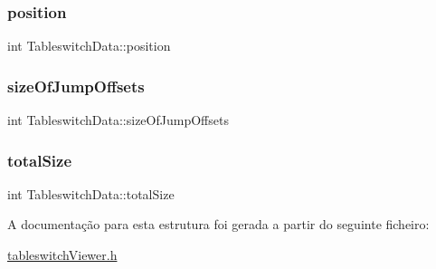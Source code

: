 \subsubsection{\texorpdfstring{position}{position}}
{\footnotesize\ttfamily int Tableswitch\+Data\+::position}

\hypertarget{struct_tableswitch_data_a1b6e4dc45c22bbeb94350bad630659ea}{}\label{struct_tableswitch_data_a1b6e4dc45c22bbeb94350bad630659ea} 
\subsubsection{\texorpdfstring{size\+Of\+Jump\+Offsets}{sizeOfJumpOffsets}}
{\footnotesize\ttfamily int Tableswitch\+Data\+::size\+Of\+Jump\+Offsets}

\hypertarget{struct_tableswitch_data_a3307b28129c7614fa88231d7f3c47b30}{}\label{struct_tableswitch_data_a3307b28129c7614fa88231d7f3c47b30} 
\subsubsection{\texorpdfstring{total\+Size}{totalSize}}
{\footnotesize\ttfamily int Tableswitch\+Data\+::total\+Size}



A documentação para esta estrutura foi gerada a partir do seguinte ficheiro\+:\begin{DoxyCompactItemize}
\item 
\hyperlink{tableswitch_viewer_8h}{tableswitch\+Viewer.\+h}\end{DoxyCompactItemize}
